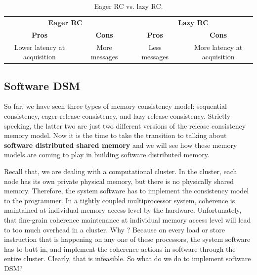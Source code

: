 \documentclass[11pt]{lecture}
\begin{document}
\begin{table}
\centering
\caption{Eager RC vs. lazy RC.}\label{tab: erc-vs-lrc}
\begin{tabular}{@{}*{7}{c}}
\toprule 
\multicolumn{3}{c}{\bf Eager RC}&\phantom{ab}&\multicolumn{3}{c}{\bf Lazy RC}\\
\cmidrule(lr){1-3}\cmidrule(lr){5-7}
{\bf Pros} &\phantom{a}& {\bf Cons} && {\bf Pros} &\phantom{a}& {\bf Cons} \\
\midrule
Lower latency at acquisition&&More messages  && Less messages && More latency at acquisition\\
\bottomrule
\end{tabular}
\end{table}

\subsection{Software DSM}\label{subsec: softDSM}

So far, we have seen three types of memory consistency model: sequential consistency, eager release consistency, 
and lazy release consistency. Strictly specking, the latter two are just two different versions of the release 
consistency memory model. Now it is the time to take the transition to talking about {\bf software distributed 
shared memory} and we will see how these memory models are coming to play in building software distributed 
memory. 

Recall that, we are dealing with a computational cluster. In the cluster, each node has its own private physical 
memory, but there is no physically shared memory. Therefore, the system software has to implement the consistency model 
to the programmer. In a tightly coupled multiprocessor system, coherence is maintained at individual memory 
access level by the hardware. Unfortunately, that fine-grain coherence maintenance at individual memory access 
level will lead to too much overhead in a cluster. Why ? Because on every load or store instruction that 
is happening on any one of these processors, the system software has to butt in, and implement the coherence actions 
in software through the entire cluster. Clearly, that is infeasible. So what do we do to implement software DSM? 
\end{document}
